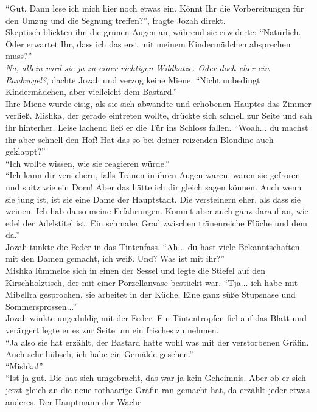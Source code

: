 ``Gut. Dann lese ich mich hier noch etwas ein. Könnt Ihr die Vorbereitungen für den Umzug und die 
Segnung treffen?'', fragte Jozah direkt.\\
Skeptisch blickten ihn die grünen Augen an, während sie erwiderte: ``Natürlich. Oder erwartet Ihr, 
dass ich das erst mit meinem Kindermädchen absprechen muss?''\\
\textit{Na, allein wird sie ja zu einer richtigen Wildkatze. Oder doch eher ein Raubvogel?}, dachte 
Jozah und verzog keine Miene. ``Nicht unbedingt Kindermädchen, aber vielleicht dem Bastard.''\\
Ihre Miene wurde eisig, als sie sich abwandte und erhobenen Hauptes das Zimmer verließ. Mishka, der 
gerade eintreten wollte, drückte sich schnell zur Seite und sah ihr hinterher. Leise lachend ließ 
er die Tür ins Schloss fallen. ``Woah... du machst ihr aber schnell den Hof! Hat das so bei deiner 
reizenden Blondine auch geklappt?''\\
``Ich wollte wissen, wie sie reagieren würde.''\\
``Ich kann dir versichern, falls Tränen in ihren Augen waren, waren sie gefroren und spitz wie ein 
Dorn! Aber das hätte ich dir gleich sagen können. Auch wenn sie jung ist, ist sie eine Dame der 
Hauptstadt. Die versteinern eher, als dass sie weinen. Ich hab da so meine Erfahrungen. Kommt aber 
auch ganz darauf an, wie edel der Adelstitel ist. Ein schmaler Grad zwischen tränenreiche Flüche 
und dem da.''\\
Jozah tunkte die Feder in das Tintenfass. ``Ah... du hast viele Bekanntschaften mit den 
Damen gemacht, ich weiß. Und? Was ist mit ihr?''\\
Mishka lümmelte sich in einen der Sessel und legte die Stiefel auf den Kirschholztisch, der mit 
einer Porzellanvase bestückt war. ``Tja... ich habe mit Mibellra gesprochen, sie arbeitet in der 
Küche. Eine ganz süße Stupsnase und Sommersprossen...''\\
Jozah winkte ungeduldig mit der Feder. Ein Tintentropfen fiel auf das Blatt und verärgert legte er 
es zur Seite um ein frisches zu nehmen.\\
``Ja also sie hat erzählt, der Bastard hatte wohl was mit der verstorbenen Gräfin. Auch sehr 
hübsch, ich habe ein Gemälde gesehen.''\\
``Mishka!''\\
``Ist ja gut. Die hat sich umgebracht, das war ja kein Geheimnis. Aber ob er sich jetzt gleich an 
die neue rothaarige Gräfin ran gemacht hat, da erzählt jeder etwas anderes. Der Hauptmann der Wache 
